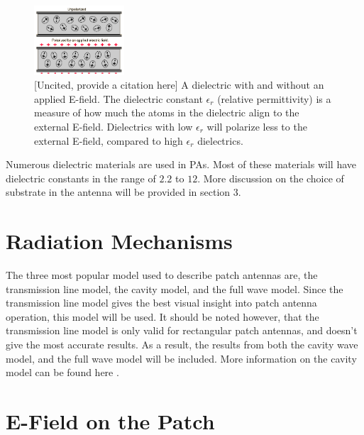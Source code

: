 \documentclass[12pt]{article}
\begin{document}
\begin{figure}[h]
    \centering
    \includegraphics[width=0.3\textwidth]{dielectric.png}
    \caption{ [Uncited, provide a citation here] A dielectric with and without an applied E-field. The dielectric constant $\epsilon_r$ (relative permittivity) is a measure of how much the atoms in the dielectric align to the external E-field. Dielectrics with low $\epsilon_r$ will polarize less to the external E-field, compared to high $\epsilon_r$ dielectrics.}
\end{figure}

Numerous dielectric materials are used in PAs. Most of these materials will have dielectric constants in the range of $2.2$ to $12$\cite{balanis2016antenna}. More discussion on the choice of substrate in the antenna will be provided in section 3. 
\section{Radiation Mechanisms}

The three most popular model used to describe patch antennas are, the transmission line model, the cavity model, and the full wave model\cite{balanis2016antenna}. Since the transmission line model gives the best visual insight\cite{balanis2016antenna} into patch antenna operation, this model will be used. It should be noted however, that the transmission line model is only valid for rectangular patch antennas, and doesn't give the most accurate results\cite{balanis2016antenna}. As a result, the results from both the cavity wave model, and the full wave model will be included. More information on the cavity model can be found here \cite{balanis2016antenna}. 


\section{E-Field on the Patch}
 
\end{document}

